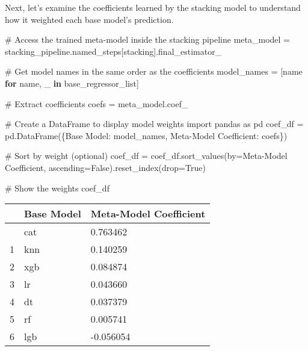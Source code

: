 \documentclass[
  letterpaper,
  DIV=11,
  numbers=noendperiod]{scrreprt}
\newenvironment{Shaded}{\begin{snugshade}}{\end{snugshade}}
\newcommand{\CommentTok}[1]{\textcolor[rgb]{0.37,0.37,0.37}{#1}}
\newcommand{\ControlFlowTok}[1]{\textcolor[rgb]{0.00,0.23,0.31}{\textbf{#1}}}
\newcommand{\ImportTok}[1]{\textcolor[rgb]{0.00,0.46,0.62}{#1}}
\newcommand{\KeywordTok}[1]{\textcolor[rgb]{0.00,0.23,0.31}{\textbf{#1}}}
\newcommand{\NormalTok}[1]{\textcolor[rgb]{0.00,0.23,0.31}{#1}}
\newcommand{\OperatorTok}[1]{\textcolor[rgb]{0.37,0.37,0.37}{#1}}
\newcommand{\StringTok}[1]{\textcolor[rgb]{0.13,0.47,0.30}{#1}}
\newcommand{\VariableTok}[1]{\textcolor[rgb]{0.07,0.07,0.07}{#1}}
\begin{document}
Next, let's examine the coefficients learned by the stacking model to
understand how it weighted each base model's prediction.

\begin{Shaded}
\begin{Highlighting}[]
\CommentTok{\# Access the trained meta{-}model inside the stacking pipeline}
\NormalTok{meta\_model }\OperatorTok{=}\NormalTok{ stacking\_pipeline.named\_steps[}\StringTok{\textquotesingle{}stacking\textquotesingle{}}\NormalTok{].final\_estimator\_}

\CommentTok{\# Get model names in the same order as the coefficients}
\NormalTok{model\_names }\OperatorTok{=}\NormalTok{ [name }\ControlFlowTok{for}\NormalTok{ name, \_ }\KeywordTok{in}\NormalTok{ base\_regressor\_list]}

\CommentTok{\# Extract coefficients}
\NormalTok{coefs }\OperatorTok{=}\NormalTok{ meta\_model.coef\_}

\CommentTok{\# Create a DataFrame to display model weights}
\ImportTok{import}\NormalTok{ pandas }\ImportTok{as}\NormalTok{ pd}
\NormalTok{coef\_df }\OperatorTok{=}\NormalTok{ pd.DataFrame(\{}\StringTok{\textquotesingle{}Base Model\textquotesingle{}}\NormalTok{: model\_names, }\StringTok{\textquotesingle{}Meta{-}Model Coefficient\textquotesingle{}}\NormalTok{: coefs\})}

\CommentTok{\# Sort by weight (optional)}
\NormalTok{coef\_df }\OperatorTok{=}\NormalTok{ coef\_df.sort\_values(by}\OperatorTok{=}\StringTok{\textquotesingle{}Meta{-}Model Coefficient\textquotesingle{}}\NormalTok{, ascending}\OperatorTok{=}\VariableTok{False}\NormalTok{).reset\_index(drop}\OperatorTok{=}\VariableTok{True}\NormalTok{)}

\CommentTok{\# Show the weights}
\NormalTok{coef\_df}
\end{Highlighting}
\end{Shaded}

\begin{longtable}[]{@{}lll@{}}
\toprule\noalign{}
& Base Model & Meta-Model Coefficient \\
\midrule\noalign{}
\endhead
\bottomrule\noalign{}
\endlastfoot
0 & cat & 0.763462 \\
1 & knn & 0.140259 \\
2 & xgb & 0.084874 \\
3 & lr & 0.043660 \\
4 & dt & 0.037379 \\
5 & rf & 0.005741 \\
6 & lgb & -0.056054 \\
\end{longtable}
\end{document}
